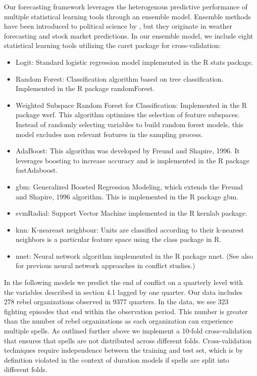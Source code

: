\documentclass[11pt,oneside,fullpage]{amsart}
\begin{document}
Our forecasting framework leverages the heterogenous predictive performance of multiple statistical learning tools through an ensemble model. Ensemble methods have been introduced to political science by \citet{montgomery:2012}, but they originate in weather forecasting and stock market predictions. In our ensemble model, we include eight statistical learning tools utilizing the caret package for cross-validation:
\begin{itemize}
\item{Logit: Standard logistic regression model implemented in the R stats package.}
\item{Random Forest: Classification algorithm based on tree classification. Implemented in the R package randomForest.}
\item{Weighted Subspace Random Forest for Classification: Implemented in the R package wsrf. This algorithm optimizes the selection of feature subspaces. Instead of randomly selecting variables to build random forest models, this model excludes non relevant features in the sampling process.}
\item{AdaBoost: This algorithm was developed by Freund and Shapire, 1996. It leverages boosting to increase accuracy and is implemented in the R package fastAdaboost.}
\item{gbm: Generalized Boosted Regression Modeling, which extends the Freund and Shapire, 1996 algorithm. This is implemented in the R package gbm.}
\item{svmRadial: Support Vector Machine implemented in the R kernlab package.}
\item{knn: K-neareast neighbour}: Units are classified according to their k-nearest neighbors is a particular feature space using the class package in R.
\item{nnet: Neural network algorithm implemented in the R package nnet. (See also \citet{Schrodt01101991} for previous neural network approaches in conflict studies.)}
\end{itemize}

In the following models we predict the end of conflict on a quarterly level with the variables described in section 4.1 lagged by one quarter. Our data includes 278 rebel organizations observed in 9377 quarters. In the data, we see 323 fighting episodes that end within the observation period. This number is greater than the number of rebel organizations as each organization can experience multiple spells. As outlined further above we implement a 10-fold cross-validation that ensures that spells are not distributed across different folds. Cross-validation techniques require independence between the training and test set, which is by definition violated in the context of duration models if spells are split into different folds.
\end{document}

